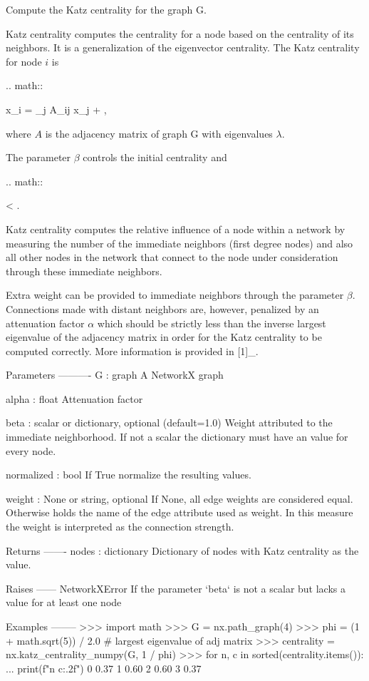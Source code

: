 \begin{DoxyVerb}Compute the Katz centrality for the graph G.

Katz centrality computes the centrality for a node based on the centrality
of its neighbors. It is a generalization of the eigenvector centrality. The
Katz centrality for node $i$ is

.. math::

    x_i = \alpha \sum_{j} A_{ij} x_j + \beta,

where $A$ is the adjacency matrix of graph G with eigenvalues $\lambda$.

The parameter $\beta$ controls the initial centrality and

.. math::

    \alpha < .

Katz centrality computes the relative influence of a node within a
network by measuring the number of the immediate neighbors (first
degree nodes) and also all other nodes in the network that connect
to the node under consideration through these immediate neighbors.

Extra weight can be provided to immediate neighbors through the
parameter $\beta$.  Connections made with distant neighbors
are, however, penalized by an attenuation factor $\alpha$ which
should be strictly less than the inverse largest eigenvalue of the
adjacency matrix in order for the Katz centrality to be computed
correctly. More information is provided in [1]_.

Parameters
----------
G : graph
  A NetworkX graph

alpha : float
  Attenuation factor

beta : scalar or dictionary, optional (default=1.0)
  Weight attributed to the immediate neighborhood. If not a scalar the
  dictionary must have an value for every node.

normalized : bool
  If True normalize the resulting values.

weight : None or string, optional
  If None, all edge weights are considered equal.
  Otherwise holds the name of the edge attribute used as weight.
  In this measure the weight is interpreted as the connection strength.

Returns
-------
nodes : dictionary
   Dictionary of nodes with Katz centrality as the value.

Raises
------
NetworkXError
   If the parameter `beta` is not a scalar but lacks a value for at least
   one node

Examples
--------
>>> import math
>>> G = nx.path_graph(4)
>>> phi = (1 + math.sqrt(5)) / 2.0  # largest eigenvalue of adj matrix
>>> centrality = nx.katz_centrality_numpy(G, 1 / phi)
>>> for n, c in sorted(centrality.items()):
...     print(f"{n} {c:.2f}")
0 0.37
1 0.60
2 0.60
3 0.37


\end{DoxyVerb}
